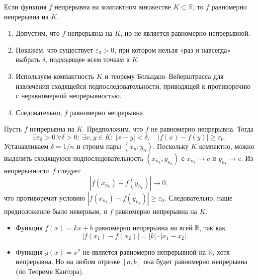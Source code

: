 

\begin{customtheorem}
	Если функция $f$ непрерывна на компактном множестве $K \subset \mathbb{R}$,
	то $f$ равномерно непрерывна на $K$.
\end{customtheorem}

\begin{proofplan}
	\begin{enumerate}
		\item Допустим, что \(f\) непрерывна на \(K\), но не является равномерно непрерывной.
		\item Покажем, что существует \(\varepsilon_0 > 0\), при котором нельзя «раз и навсегда»
		      выбрать \(\delta\), подходящее всем точкам в \(K\).
		\item Используем компактность \(K\) и теорему Больцано–Вейерштрасса для
		      извлечения сходящейся подпоследовательности, приводящей к противоречию
		      с неравномерной непрерывностью.
		\item Следовательно, \(f\) равномерно непрерывна.
	\end{enumerate}
\end{proofplan}

\begin{customproof}
	Пусть $f$ непрерывна на $K$. Предположим, что $f$ не равномерно непрерывна. Тогда
	\[
		\exists \varepsilon_0 > 0\ \forall \delta > 0:\
		\exists x, y \in K:\ |x - y| < \delta,\quad |f(x) - f(y)| \ge \varepsilon_0.
	\]
	Устанавливаем $\delta = 1/n$ и строим пары $(x_n, y_n)$. Поскольку $K$ компактно,
	можно выделить сходящуюся подпоследовательность $(x_{n_k}, y_{n_k})$
	с $x_{n_k} \to c$ и $y_{n_k} \to c$.
	Из непрерывности $f$ следует
	\[
		|f(x_{n_k}) - f(y_{n_k})| \to 0,
	\]
	что противоречит условию $|f(x_{n_k}) - f(y_{n_k})| \ge \varepsilon_0$.
	Следовательно, наше предположение было неверным, и $f$ равномерно непрерывна на $K$.
\end{customproof}

\begin{customexample}
	\begin{itemize}
		\item Функция $f(x) = kx + b$ равномерно непрерывна на всей $\mathbb{R}$, так как
		      \[
			      |f(x_1) - f(x_2)| = |k|\cdot |x_1 - x_2|.
		      \]
		\item Функция $g(x) = x^2$ не является равномерно непрерывной на $\mathbb{R}$,
		      хотя непрерывна. Но на любом отрезке $[a,b]$ она будет равномерно непрерывна
		      (по Теореме Кантора).
	\end{itemize}
\end{customexample}

